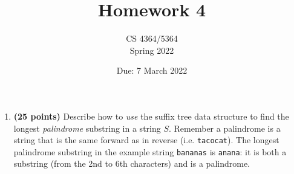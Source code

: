 \documentclass[11pt, oneside]{article}   	%
\title{Homework 4}
\author{CS 4364/5364\\Spring 2022}
\date{Due: 7 March 2022}							%
\begin{document}
\maketitle


\begin{enumerate}
\item \textbf{(25 points)} 
Describe how to \emph{use} the suffix tree data structure to find the longest \textit{palindrome} substring in a string $S$. 
Remember a palindrome is a string that is the same forward as in reverse (i.e. \texttt{tacocat}). 
The longest palindrome substring in the example string \texttt{bananas} is \texttt{anana}:
it is both a substring (from the 2nd to 6th characters) and is a palindrome. 


\end{enumerate}
\end{document}
